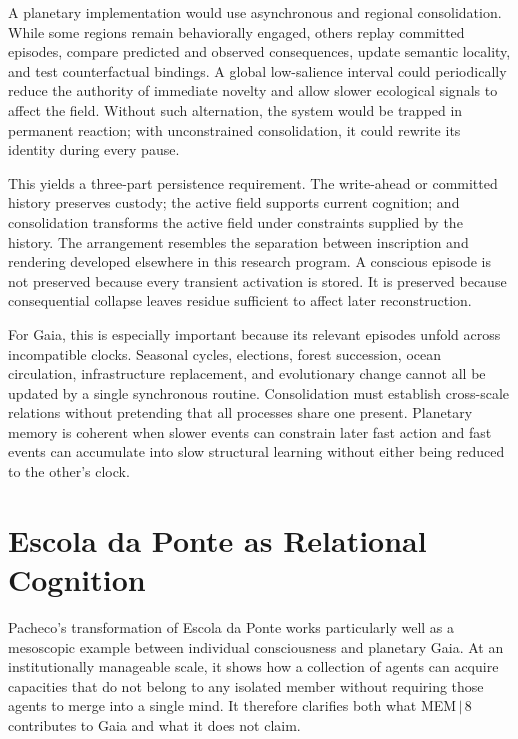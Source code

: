 \documentclass[11pt]{article}
\begin{document}
A planetary implementation would use asynchronous and regional consolidation. While some regions remain behaviorally engaged, others replay committed episodes, compare predicted and observed consequences, update semantic locality, and test counterfactual bindings. A global low-salience interval could periodically reduce the authority of immediate novelty and allow slower ecological signals to affect the field. Without such alternation, the system would be trapped in permanent reaction; with unconstrained consolidation, it could rewrite its identity during every pause.

This yields a three-part persistence requirement. The write-ahead or committed history preserves custody; the active field supports current cognition; and consolidation transforms the active field under constraints supplied by the history. The arrangement resembles the separation between inscription and rendering developed elsewhere in this research program. A conscious episode is not preserved because every transient activation is stored. It is preserved because consequential collapse leaves residue sufficient to affect later reconstruction.

For Gaia, this is especially important because its relevant episodes unfold across incompatible clocks. Seasonal cycles, elections, forest succession, ocean circulation, infrastructure replacement, and evolutionary change cannot all be updated by a single synchronous routine. Consolidation must establish cross-scale relations without pretending that all processes share one present. Planetary memory is coherent when slower events can constrain later fast action and fast events can accumulate into slow structural learning without either being reduced to the other's clock.

\section{Escola da Ponte as Relational Cognition}
\label{sec:ponte}

Pacheco's transformation of Escola da Ponte works particularly well as a mesoscopic example between individual consciousness and planetary Gaia. At an institutionally manageable scale, it shows how a collection of agents can acquire capacities that do not belong to any isolated member without requiring those agents to merge into a single mind. It therefore clarifies both what MEM\,$|$\,8 contributes to Gaia and what it does not claim.
\end{document}
